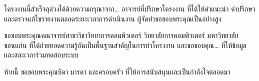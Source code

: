 โครงงานนี้สำเร็จลุล่วงได้ด้วยความกรุณาจาก\ldots{} อาจารย์ที่ปรึกษาโครงงาน
ที่ได้ให้คำแนะนำ คำปรึกษา และตรวจแก้ไขรายงานตลอดระยะเวลาการดำเนินงาน
ผู้จัดทำขอขอบพระคุณเป็นอย่างสูง

ขอขอบพระคุณคณาจารย์สาขาวิชาวิทยาการคอมพิวเตอร์ วิทยาลัยการคอมพิวเตอร์ มหาวิทยาลัยขอนแก่น
ที่ได้ถ่ายทอดความรู้อันเป็นพื้นฐานสำคัญในการทำโครงงาน
และขอขอบคุณ\ldots{} ที่ให้ข้อมูลและสละเวลาร่วมทดสอบระบบ

ท้ายนี้ ขอขอบพระคุณบิดา มารดา และครอบครัว ที่ให้การสนับสนุนและเป็นกำลังใจตลอดมา
